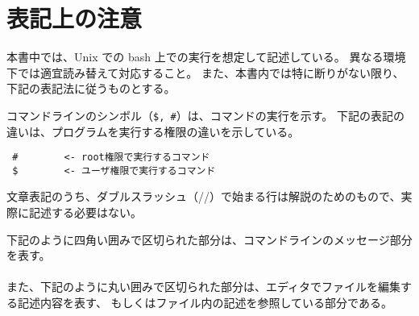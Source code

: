 \section{表記上の注意}

本書中では、Unix での bash 上での実行を想定して記述している。
異なる環境下では適宜読み替えて対応すること。
また、本書内では特に断りがない限り、下記の表記法に従うものとする。


コマンドラインのシンボル（\verb|$, #|）は、コマンドの実行を示す。
下記の表記の違いは、プログラムを実行する権限の違いを示している。

\begin{verbatim}
 #        <- root権限で実行するコマンド
 $        <- ユーザ権限で実行するコマンド
\end{verbatim}

文章表記のうち、ダブルスラッシュ（//）で始まる行は解説のためのもので、実際に記述する必要はない。

下記のように四角い囲みで区切られた部分は、コマンドラインのメッセージ部分を表す。\\

\\

また、下記のように丸い囲みで区切られた部分は、エディタでファイルを編集する記述内容を表す、
もしくはファイル内の記述を参照している部分である。\\

